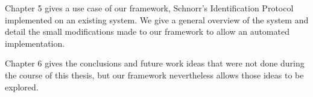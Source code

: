 Chapter 5 gives a use case of our framework, Schnorr's Identification
Protocol implemented on an existing system. We give a general overview
of the system and detail the small modifications made to our framework
to allow an automated implementation.

Chapter 6 gives the conclusions and future work ideas that were not
done during the course of this thesis, but our framework nevertheless
allows those ideas to be explored.

